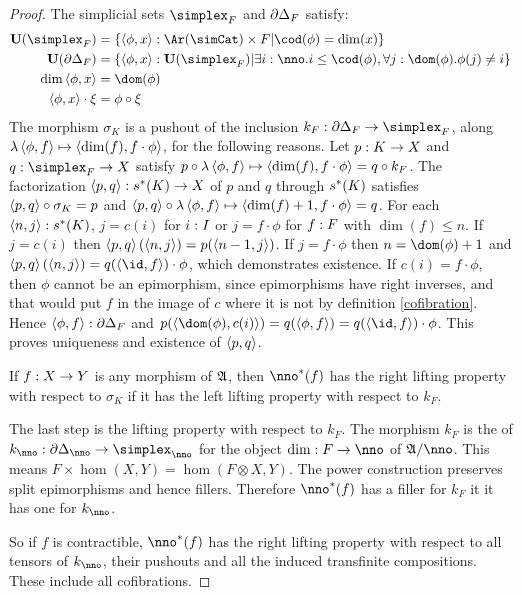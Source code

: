 \documentclass[csh.tex]{subfiles}
\begin{document}
\begin{proof}
The simplicial sets $\simplex_F$ and $\partial\Delta_F$ satisfy:
\begin{align*}
\base(\simplex_F) &= \set{ \tuplet{\phi,x}\of\Ar(\simCat)\times F | \cod(\phi) = \dim(x) } \\
\base(\cycle_F) &= \set{\tuplet{\phi,x}\of\base(\simplex_F)\middle|\exists i\of\nno.i\leq \cod(\phi),\forall j\of \dom(\phi).\phi(j)\neq i} \\
\dim\tuplet{\phi,x} &= \dom(\phi) \\
\tuplet{\phi,x}\cdot \xi &=\phi\circ\xi
\end{align*}
The morphism $\sigma_K$ is a pushout of the inclusion $k_F\of\cycle_F\to\simplex_F$, along $\lambda \left\langle \phi,f \right\rangle \mapsto\left\langle \dim(f),f\cdot \phi \right\rangle$, for the following reasons. Let $p: K \to X$ and $q\of \simplex_F\to X$ satisfy $p\circ \lambda \left\langle \phi,f \right\rangle \mapsto\left\langle \dim(f),f\cdot \phi \right\rangle = q\circ k_F$. 
The factorization $\left\langle p,q \right\rangle: s^*(K)\to X$ of $p$ and $q$ through $s^*(K)$ satisfies $\left\langle p,q \right\rangle\circ \sigma_K = p$ and $\left\langle p,q \right\rangle\circ \lambda \left\langle \phi,f \right\rangle \mapsto\left\langle \dim(f)+1,f\cdot \phi \right\rangle = q$. 
For each $\left\langle n,j \right\rangle: s^*(K)$, $j = c(i)$ for $i: I$ or $j = f\cdot \phi$ for $f: F$ with $\dim(f)\leq n$. If $j=c(i)$ then $\left\langle p,q \right\rangle(\left\langle n,j \right\rangle) = p(\left\langle n-1,j \right\rangle)$. If $j = f\cdot \phi$ then $n=\dom(\phi)+1$ and $\tuplet{p,q}(\tuplet{n,j}) = q(\tuplet{\id,f})\cdot\phi$, which demonstrates existence. 
If $c(i)=f\cdot\phi$, then $\phi$ cannot be an epimorphism, since epimorphisms have right inverses, and that would put $f$ in the image of $c$ where it is not by definition \ref{cofibration}. Hence $\left\langle \phi,f \right\rangle:\partial\Delta_F$ and $p(\tuplet{\dom(\phi),c(i)})=q(\tuplet{\phi,f}) = q(\tuplet{\id,f})\cdot\phi$. This proves uniqueness and existence of $\left\langle p,q \right\rangle$.

If $f: X\to Y$ is any morphism of $\mathfrak A$, then $\nno\ri(f)$ has the right lifting property with respect to $\sigma_K$ if it has the left lifting property with respect to $k_F$.

The last step is the lifting property with respect to $k_F$. The morphism $k_F$ is the  of $k_\nno\of\cycle_\nno\to\simplex_\nno$ for the object $\dim\of F\to\nno$ of $\ambient/\nno$. This means $F\times \hom(X,Y) = \hom(F\otimes X,Y)$.
The power construction preserves split epimorphisms and hence fillers. Therefore $\nno\ri(f)$ has a filler for $k_F$ it it has one for $k_\nno$.

So if $f$ is contractible, $\nno\ri(f)$ has the right lifting property with respect to all tensors of $k_\nno$, their pushouts and all the induced transfinite compositions. These include all cofibrations.
\end{proof}
\end{document}
